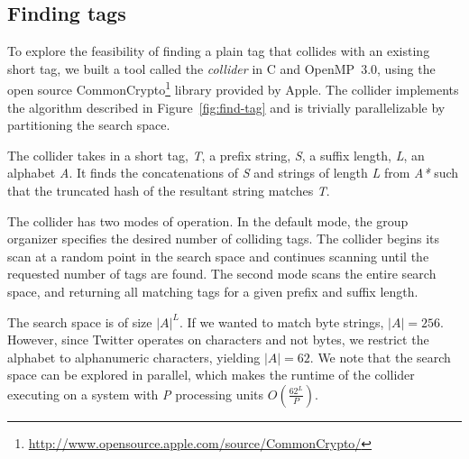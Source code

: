 \documentclass{sig-alternate-arxiv}
\begin{document}
\subsection{Finding tags}
\label{sec:collider}

To explore the feasibility of finding a plain tag that collides with an
existing short tag, we built a tool called the {\em collider} in C and
OpenMP~3.0, using the open source CommonCrypto\footnote{\url{http://www.opensource.apple.com/source/CommonCrypto/}} library provided
by Apple. The collider implements the  algorithm
described in Figure~\ref{fig:find-tag} and is trivially parallelizable
by partitioning the search space.

The collider takes in a short tag, \textit{T}, a prefix string,
\textit{S}, a suffix length, \textit{L}, an alphabet \textit{A}. It
finds the concatenations of \textit{S} and strings of length \textit{L}
from \textit{A*} such that the truncated hash of the resultant string
matches \textit{T}.

The collider has two modes of operation. In the default mode, the group
organizer specifies the desired number of colliding tags. The collider
begins its scan at a random point in the search space and continues
scanning until the requested number of tags are found. The second mode
scans the entire search space, and returning all matching tags for a
given prefix and suffix length.

The search space is of size $|A|^L$. If we wanted to match byte strings,
$|A| = 256$. However, since Twitter operates on characters and not
bytes, we restrict the alphabet to alphanumeric characters, yielding
$|A| = 62$. We note that the search space can be explored in parallel,
which makes the runtime of the collider executing on a system with
\textit{P} processing units $O(\frac{62^L}{P})$.
\end{document}
